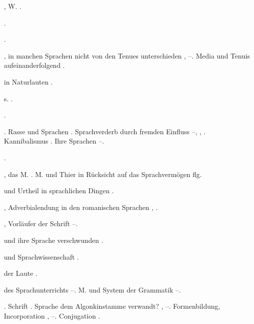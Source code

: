 \begin{register}
, W. \pageref{sp.194}.

 \pageref{sp.383}\sed{, \pageref{sp.389}}.

 \pageref{sp.258}. 

,  in manchen Sprachen nicht von den Tenues unterschieden \pageref{sp.188}, \pageref{sp.194}–\pageref{sp.195}. Media und Tenuis aufeinanderfolgend \pageref{sp.201}.


 in Naturlauten \pageref{sp.314}.

 s. .

 \pageref{sp.147}.

.  Rasse und Sprachen \pageref{sp.147}. Sprachverderb durch fremden Einfluss \pageref{sp.155}–\pageref{sp.166}, \pageref{sp.406}, \pageref{sp.428}. Kannibalismus \pageref{sp.177}. Ihre Sprachen \pageref{sp.280}–\pageref{sp.283}.

 \pageref{sp.160}.

, das M. \pageref{sp.236}. M. und Thier in Rücksicht auf das Sprachvermögen \pageref{sp.303} flg.

 und Urtheil in sprachlichen Dingen \pageref{sp.47}.

,  Adverbialendung in den romanischen Sprachen \pageref{sp.316}, \pageref{sp.348}\sed{, \pageref{sp.437}}.

, Vorläufer der Schrift \pageref{sp.127}–\pageref{sp.128}.

 und ihre Sprache verschwunden \pageref{sp.146}.

 und Sprachwissenschaft \pageref{sp.14}.

 der Laute \pageref{sp.200}.

 des Sprachunterrichts \pageref{sp.71}–\pageref{sp.75}. M. und System der Grammatik \pageref{sp.109}–\pageref{sp.110}.

. Schrift \pageref{sp.130}. Sprache dem Algonkinstamme verwandt? \pageref{sp.147}, \sed{\pageref{sp.152},} \pageref{sp.162}–\pageref{sp.163}. Formenbildung, Incorporation \pageref{sp.328}, \pageref{sp.354}–\pageref{sp.357}.  Conjugation \pageref{sp.383}.


\end{register}
